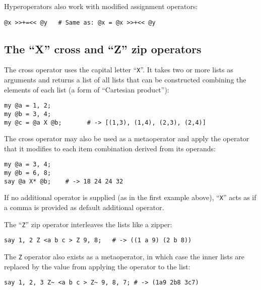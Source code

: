Hyperoperators also work with modified assignment 
operators:

\begin{verbatim}
@x >>+=<< @y   # Same as: @x = @x >>+<< @y
\end{verbatim}

\subsection{The ``X'' cross and ``Z'' zip operators}

The cross operator uses the capital letter ``\verb"X"''.
It takes two or more lists as arguments and returns a list 
of all lists that can be constructed combining the elements 
of each list (a form of ``Cartesian product''):

\begin{verbatim}
my @a = 1, 2;
my @b = 3, 4;
my @c = @a X @b;       # -> [(1,3), (1,4), (2,3), (2,4)]
\end{verbatim}

The cross operator may also be used as a metaoperator and 
apply the operator that it modifies to each item combination 
derived from its operands:

\begin{verbatim}
my @a = 3, 4;
my @b = 6, 8;
say @a X* @b;    # -> 18 24 24 32
\end{verbatim}

If no additional operator is supplied (as in the first 
example above), ``\verb"X"'' acts as if a comma is 
provided as default additional operator. 

The ``\verb"Z"'' zip operator interleaves the lists 
like a zipper:

\begin{verbatim}
say 1, 2 Z <a b c > Z 9, 8;   # -> ((1 a 9) (2 b 8))
\end{verbatim}

The \verb'Z' operator also exists as a metaoperator, in 
which case the inner lists are replaced by the value 
from applying the operator to the list:

\begin{verbatim}
say 1, 2, 3 Z~ <a b c > Z~ 9, 8, 7; # -> (1a9 2b8 3c7)
\end{verbatim}

